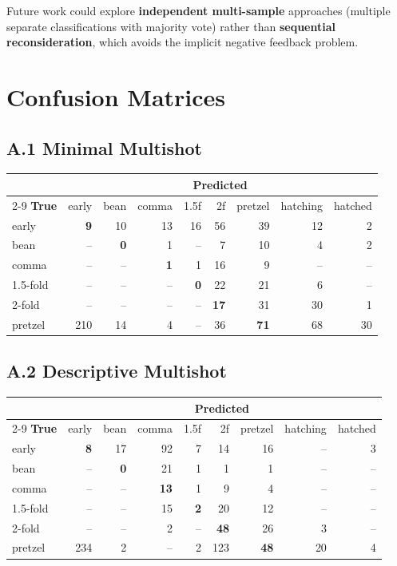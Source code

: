 \documentclass[11pt, a4paper]{article}
\begin{document}
Future work could explore \textbf{independent multi-sample} approaches
(multiple separate classifications with majority vote) rather than
\textbf{sequential reconsideration}, which avoids the implicit negative feedback
problem.

\appendix
\section{Confusion Matrices}

\subsection*{A.1 Minimal Multishot}

\begin{center}
\small
\begin{tabular}{@{}l*{8}{r}@{}}
\toprule
& \multicolumn{8}{c}{\textbf{Predicted}} \\
\cmidrule(l){2-9}
\textbf{True} & early & bean & comma & 1.5f & 2f & pretzel & hatching & hatched \\
\midrule
early    & \textbf{9} & 10 & 13 & 16 & 56 & 39 & 12 & 2 \\
bean     & -- & \textbf{0} & 1 & -- & 7 & 10 & 4 & 2 \\
comma    & -- & -- & \textbf{1} & 1 & 16 & 9 & -- & -- \\
1.5-fold & -- & -- & -- & \textbf{0} & 22 & 21 & 6 & -- \\
2-fold   & -- & -- & -- & -- & \textbf{17} & 31 & 30 & 1 \\
pretzel  & 210 & 14 & 4 & -- & 36 & \textbf{71} & 68 & 30 \\
\bottomrule
\end{tabular}
\end{center}

\subsection*{A.2 Descriptive Multishot}

\begin{center}
\small
\begin{tabular}{@{}l*{8}{r}@{}}
\toprule
& \multicolumn{8}{c}{\textbf{Predicted}} \\
\cmidrule(l){2-9}
\textbf{True} & early & bean & comma & 1.5f & 2f & pretzel & hatching & hatched \\
\midrule
early    & \textbf{8} & 17 & 92 & 7 & 14 & 16 & -- & 3 \\
bean     & -- & \textbf{0} & 21 & 1 & 1 & 1 & -- & -- \\
comma    & -- & -- & \textbf{13} & 1 & 9 & 4 & -- & -- \\
1.5-fold & -- & -- & 15 & \textbf{2} & 20 & 12 & -- & -- \\
2-fold   & -- & -- & 2 & -- & \textbf{48} & 26 & 3 & -- \\
pretzel  & 234 & 2 & -- & 2 & 123 & \textbf{48} & 20 & 4 \\
\bottomrule
\end{tabular}
\end{center}
\end{document}
